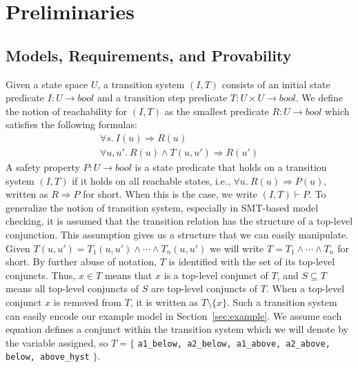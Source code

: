 \section{Preliminaries}
\label{sec:background}
\newcommand{\satisfies}{\vdash_{\!\!s}}
\newcommand{\nsatisfies}{\nvdash_{\!\!s}}
\newcommand{\bool}[0]{\mathit{bool}}
\newcommand{\reach}[0]{\mathit{R}}
\newcommand{\ite}[3]{\mathit{if}\ {#1}\ \mathit{then}\ {#2}\ \mathit{else}\ {#3}}


\subsection{Models, Requirements, and Provability}

Given a state space $U$, a transition system $(I,T)$ consists of an
initial state predicate $I : U \to \bool$ and a transition step
predicate $T : U \times U \to \bool$. We define the notion of
reachability for $(I, T)$ as the smallest predicate $\reach : U \to
\bool$ which satisfies the following formulas:
\begin{gather*}
  \forall s.~ I(u) \Rightarrow \reach(u) \\
  \forall u, u'.~ \reach(u) \land T(u, u') \Rightarrow \reach(u')
\end{gather*}
A safety property $P : U \to \bool$ is a state predicate that holds on a transition system $(I, T)$ if it holds on all
reachable states, i.e., $\forall u.~ \reach(u) \Rightarrow P(u)$,
written as $\reach \Rightarrow P$ for short. When this is the case, we
write $(I, T)\vdash P$. To generalize the notion of transition system, especially in SMT-based model checking, it is assumed that the transition relation has the structure of a top-level conjunction. This assumption gives us a structure that we can easily manipulate. Given $T(u, u') = T_1(u, u') \land \cdots \land T_n(u, u')$ we will write $T = T_1 \land \cdots \land T_n$ for short.
By further abuse of notation,
$T$ is identified with the set of its top-level conjuncts. Thus, $x \in
T$ means that $x$ is a top-level conjunct of $T$, and $S
\subseteq T$ means all top-level conjuncts of $S$ are top-level
conjuncts of $T$. When a top-level conjunct $x$ is removed from $T$, it is written as $T \setminus \{x\}$. Such a transition system can easily encode our example model in Section~\ref{sec:example}.  We assume each equation defines a conjunct within the transition system which we will denote by the variable assigned, so $T = \{$ {\small \texttt{a1\_below, a2\_below, a1\_above, a2\_above, below, above\_hyst}} $\}$.


